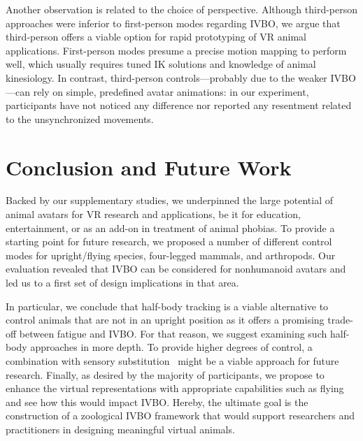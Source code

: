 Another observation is related to the choice of perspective. Although third-person approaches were inferior to first-person modes regarding IVBO, we argue that third-person offers a viable option for rapid prototyping of VR animal applications. First-person modes presume a precise motion mapping to perform well, which usually requires tuned IK solutions and knowledge of animal kinesiology. In contrast,  third-person controls---probably due to the weaker IVBO---can rely on simple, predefined avatar animations: in our experiment, participants have not noticed any difference nor reported any resentment related to the unsynchronized movements.





\section{Conclusion and Future Work}

Backed by our supplementary studies, we underpinned the large potential of animal avatars for VR research and applications, be it for education, entertainment, or as an add-on in treatment of animal phobias. To provide a starting point for future research, we proposed a number of different control modes for upright/flying species, four-legged mammals, and arthropods. Our evaluation revealed that IVBO can be considered for nonhumanoid avatars and led us to a first set of design implications in that area. 

In particular, we conclude that half-body tracking is a viable alternative to control animals that are not in an upright position as it offers a promising trade-off between fatigue and IVBO. For that reason, we suggest examining such half-body approaches in more depth. To provide higher degrees of control, a combination with sensory substitution~\cite{bach2003sensory} might be a viable approach for future research. Finally, as desired by the majority of participants, we propose to enhance the virtual representations with appropriate capabilities such as flying and see how this would impact IVBO. Hereby, the ultimate goal is the construction of a zoological IVBO framework that would support researchers and practitioners in designing meaningful virtual animals.



%
%
%
%





